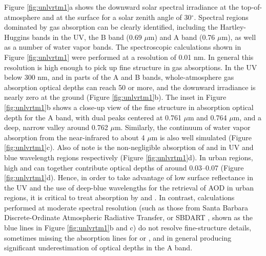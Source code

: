 Figure \ref{fig:unlvrtm1}a shows the downward solar spectral irradiance 
at the top-of-atmosphere and at the surface for a solar zenith angle of
30$^\circ$. Spectral regions dominated by gas absorption can be 
clearly identified, including the  Hartley-Huggins bands 
in the UV, the B band (0.69 $\mu$m) and A band (0.76 
$\mu$m), as well as a number of water vapor bands. The
spectroscopic calculations shown in Figure \ref{fig:unlvrtm1} were 
performed at a resolution of 0.01 nm. In general this resolution is 
high enough to pick up fine structure in gas absorptions. 
In the UV below 300 nm, and in parts of the A and B 
bands, whole-atmosphere gas absorption optical depths can reach 
50 or more, and the downward irradiance is nearly zero
at the ground (Figure \ref{fig:unlvrtm1}b). The inset in Figure
\ref{fig:unlvrtm1}b shows a close-up view of the fine structure 
in absorption optical depth for the A band, with
dual peaks centered at 0.761 $\mu$m and 0.764 $\mu$m, and a deep, 
narrow valley around 0.762 $\mu$m. Similarly, the continuum of water 
vapor absorption from the near-infrared to about 4 $\mu$m is also well 
simulated (Figure \ref{fig:unlvrtm1}c). Also of note is the 
non-negligible absorption of  and  in UV and blue
wavelength regions respectively (Figure \ref{fig:unlvrtm1}d). 
In urban regions, high  and  can together contribute 
optical depths of around 0.03--0.07 (Figure \ref{fig:unlvrtm1}d). 
Hence, in order to take advantage of low surface reflectance
in the UV and the use of deep-blue wavelengths for the retrieval of AOD
in urban regions, it is critical to treat absorption by  and
. In contrast, calculations performed at moderate spectral 
resolution (such as those from Santa Barbara Discrete-Ordinate Atmospheric 
Radiative Transfer, or SBDART \citep{Ricchiazzi98}, shown as the blue 
lines in Figure \ref{fig:unlvrtm1}b and c) do not resolve fine-structure 
details, sometimes missing the absorption lines for  or , 
and in general producing significant underestimation of optical depths 
in the A band.

